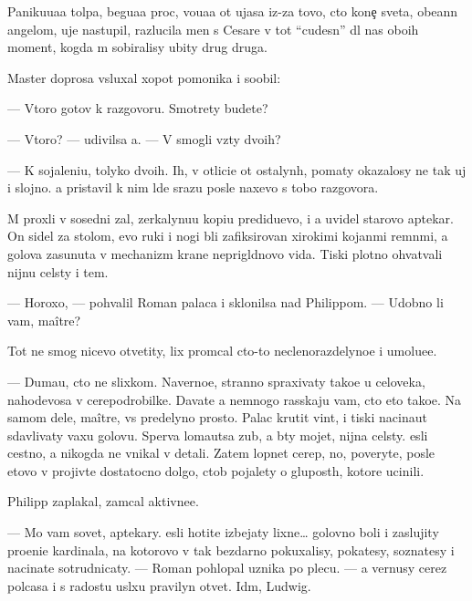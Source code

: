 \documentclass[10pt]{book}
\begin{document}
Paniku{\y}u{\x}a{\y}a tolpa, begu{\x}a{\y}a proc, vo{\y}u{\x}a{\y}a ot ujasa iz-za tovo, cto kone{\c} sveta, obe{\x}ann{\yi}{\y} angelom, uje nastupil, razlucila men{\ia} s Cesare v tot ``cudesn{\yi}{\y}'' dl{\ia} nas obo{\y}ih moment, kogda m{\yi} sobiralisy ubity drug druga.

Master doprosa v{\yi}sluxal xopot pomo{\x}nika i soob{\x}il:

— Vtoro{\y} gotov k razgovoru. Smotrety budete?

— Vtoro{\y}? — udivilsa {\y}a. — V{\yi} smogli vz{\ia}ty dvo{\y}ih?

— K sojaleni{\y}u, tolyko dvo{\y}ih. Ih, v otlici{\y}e ot ostalyn{\yi}h, po{\y}maty okazalosy ne tak uj i slojno. {\Y}a pristavil k nim l{\io}de{\y} srazu posle naxevo s tobo{\y} razgovora.

M{\yi} proxli v sosedni{\y} zal, zerkalynu{\y}u kopi{\y}u predidu{\x}evo, i {\y}a uvidel starovo aptekar{\ia}. On sidel za stolom, {\y}evo ruki i nogi b{\yi}li zafiksirovan{\yi} xirokimi kojan{\yi}mi remn{\ia}mi, a golova zasunuta v mechanizm kra{\y}ne neprigl{\ia}dnovo vida. Tiski plotno ohvat{\yi}vali nijn{\io}{\y}u cel{\io}sty i tem{\ia}.

— Horoxo, — pohvalil Roman palaca i sklonilsa nad Philippom. — Udobno li vam, maître?

Tot ne smog nicevo otvetity, lix prom{\yi}cal cto-to neclenorazdelyno{\y}e i umo\-l{\ia}\-{\y}u\-{\x}e\-{\y}e.

— Duma{\y}u, cto ne slixkom. Naverno{\y}e, stranno spraxivaty tako{\y}e u celoveka, nahod{\ia}{\x}evosa v cerepodrobilke. Dava{\y}te {\y}a nemnogo rasskaju vam, cto eto tako{\y}e. Na samom dele, maître, vs{\e} predelyno prosto. Palac krutit vint, i tiski nacina{\y}ut sdavlivaty vaxu golovu. Sperva loma{\y}utsa zub{\yi}, a b{\yi}ty mojet, nijn{\ia}{\y}a cel{\io}sty. {\Y}esli cestno, {\y}a nikogda ne vnikal v detali. Zatem lopnet cerep, no, poveryte, posle etovo v{\yi} projiv{\e}te dostatocno dolgo, ctob{\yi} pojalety o glupost{\ia}h, ko\-to\-r{\yi}\-{\y}e ucinili.

Philipp zaplakal, zam{\yi}cal aktivne{\y}e.

— Mo{\y} vam sovet, aptekary. {\Y}esli hotite izbejaty lixne{\y}… golovno{\y} boli i zaslujity pro{\x}eni{\y}e kardinala, na kotorovo v{\yi} tak bezdarno pokuxalisy, poka{\y}tesy, sozna{\y}tesy i nacina{\y}te sotrudnicaty. — Roman pohlopal uznika po plecu. — {\Y}a vernusy cerez polcasa i s radost{\y}u usl{\yi}xu pravilyn{\yi}{\y} otvet. Id{\e}m, Ludwig.
\end{document}
